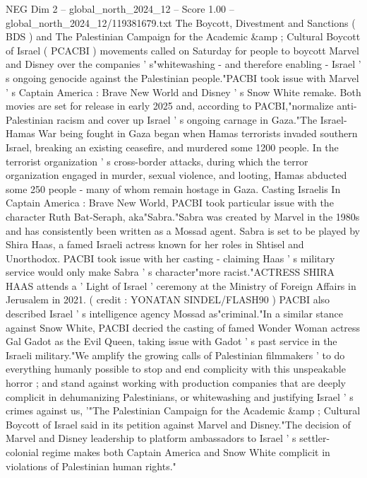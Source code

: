 \begin{textsample}{NEG Dim 2 – global\_north\_2024\_12 – Score 1.00 – global\_north\_2024\_12/119381679.txt}  \label{ex:f2_neg_268}
The Boycott, Divestment and Sanctions ( BDS ) and The Palestinian Campaign for the Academic \&amp ; Cultural Boycott of Israel ( PCACBI ) movements called on Saturday for people to boycott Marvel and Disney over the companies ' s"whitewashing - and therefore enabling - Israel ' s ongoing genocide against the Palestinian people."PACBI took issue with Marvel ' s Captain America : Brave New World and Disney ' s Snow White remake.
Both movies are set for release in early 2025 and, according to PACBI,"normalize anti-Palestinian racism and cover up Israel ' s ongoing carnage in Gaza."The Israel-Hamas War being fought in Gaza began when Hamas terrorists invaded southern Israel, breaking an existing ceasefire, and murdered some 1200 people.
In the terrorist organization ' s cross-border attacks, during which the terror organization engaged in murder, sexual violence, and looting, Hamas abducted some 250 people - many of whom remain hostage in Gaza.
Casting Israelis In Captain America : Brave New World, PACBI took particular issue with the character Ruth Bat-Seraph, aka"Sabra."Sabra was created by Marvel in the 1980s and has consistently been written as a Mossad agent.
Sabra is set to be played by Shira Haas, a famed Israeli actress known for her roles in Shtisel and Unorthodox.
PACBI took issue with her casting - claiming Haas ' s military service would only make Sabra ' s character"more racist."ACTRESS SHIRA HAAS attends a ' Light of Israel ' ceremony at the Ministry of Foreign Affairs in Jerusalem in 2021. ( credit : YONATAN SINDEL/FLASH90 ) PACBI also described Israel ' s intelligence agency Mossad as"criminal."In a similar stance against Snow White, PACBI decried the casting of famed Wonder Woman actress Gal Gadot as the Evil Queen, taking issue with Gadot ' s past service in the Israeli military."We amplify the growing calls of Palestinian filmmakers ' to do everything humanly possible to stop and end complicity with this unspeakable horror ; and stand against working with production companies that are deeply complicit in dehumanizing Palestinians, or whitewashing and justifying Israel ' s crimes against us, '"The Palestinian Campaign for the Academic \&amp ; Cultural Boycott of Israel said in its petition against Marvel and Disney."The decision of Marvel and Disney leadership to platform ambassadors to Israel ' s settler-colonial regime makes both Captain America and Snow White complicit in violations of Palestinian human rights."

\end{textsample}
